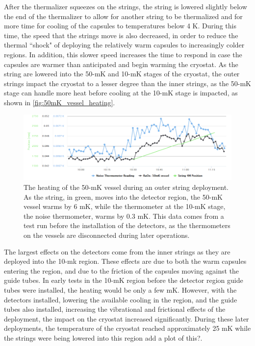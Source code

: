 After the thermalizer squeezes on the strings, the string is lowered slightly below the end of the thermalizer to allow for another string to be thermalized and for more time for cooling of the capsules to temperatures below 4 K.
During this time, the speed that the strings move is also decreased, in order to reduce the thermal ``shock" of deploying the relatively warm capsules to increasingly colder regions.
In addition, this slower speed increases the time to respond in case the capsules are warmer than anticipated and begin warming the cryostat.
As the string are lowered into the 50-mK and 10-mK stages of the cryostat, the outer strings impact the cryostat to a lesser degree than the inner strings, as the 50-mK stage can handle more heat before cooling at the 10-mK stage is impacted, as shown in \autoref{fig:50mK_vessel_heating}.
\begin{figure}
    \centering
    \includegraphics[width=0.8\linewidth]{Figures/OuterStringHeating.png}
    \caption[The heating of the 50-mK vessel during an outer string deployment.]
    {The heating of the 50-mK vessel during an outer string deployment.
    As the string, in green, moves into the detector region, the 50-mK vessel warms by 6 mK, while the thermometer at the 10-mK stage, the noise thermometer, warms by 0.3 mK.
    This data comes from a test run before the installation of the detectors, as the thermometers on the vessels are disconnected during later operations.}
    \label{fig:50mK_vessel_heating}
\end{figure}
The largest effects on the detectors come from the inner strings as they are deployed into the 10-mk region.
These effects are due to both the warm capsules entering the region, and due to the friction of the capsules moving against the guide tubes.
In early tests in the 10-mK region before the detector region guide tubes were installed, the heating would be only a few mK.
However, with the detectors installed, lowering the available cooling in the region, and the guide tubes also installed, increasing the vibrational and frictional effects of the deployment, the impact on the cryostat increased significantly.
During these later deployments, the temperature of the cryostat reached approximately 25 mK while the strings were being lowered into this region\color{red} add a plot of this?\color{black}.
